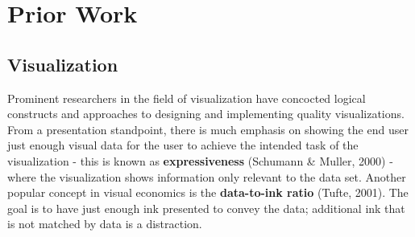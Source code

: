 \documentclass[12pt]{article}
\begin{document}

\vfill

\section{Prior Work}
\subsection{Visualization}
Prominent researchers in the field of visualization have concocted logical constructs and approaches to designing and implementing quality visualizations. From a presentation standpoint, there is much emphasis on showing the end user just enough visual data for the user to achieve the intended task of the visualization - this is known as \textbf{expressiveness} (Schumann \& Muller, 2000) - where the visualization shows information only relevant to the data set. Another popular concept in visual economics is the \textbf{data-to-ink ratio} (Tufte, 2001). The goal is to have just enough ink presented to convey the data; additional ink that is not matched by data is a distraction. 
\end{document}
